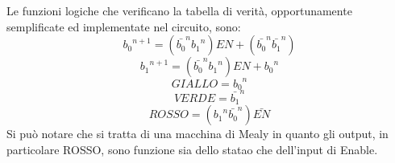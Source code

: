 Le funzioni logiche che verificano la tabella di verità, opportunamente semplificate ed implementate nel circuito, sono:
\begin{equation}
{b_0}^{n+1} = ({\bar{b_0}}^{n} {b_1}^{n}) EN + ({\bar{b_0}}^{n} {\bar{b_1}}^{n})
\label{e:eq1}
\end{equation}
\begin{equation}
{b_1}^{n+1} = ({\bar{b_0}}^{n} {b_1}^{n}) EN + {b_0}^{n}
\label{e:eq2}
\end{equation}
\begin{equation}
GIALLO = {b_0}^{n}
\label{e:eq3}
\end{equation}
\begin{equation}
VERDE = {\bar{b_1}}^{n}
\label{e:eq4}
\end{equation}
\begin{equation}
ROSSO = ({b_1}^{n} {\bar{b_0}}^{n}) \bar{EN}
\label{e:eq5}
\end{equation}
Si può notare che si tratta di una macchina di Mealy in quanto gli output, in particolare ROSSO, sono funzione sia dello statao che dell'input di Enable.

